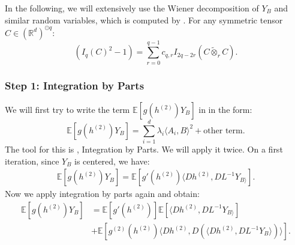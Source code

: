 \documentclass[]{article}
\numberwithin{equation}{section}
\theoremstyle{definition}
\newcommand{\RR}{\mathbb{R}}
\newcommand{\EE}{\mathbb{E}}
\begin{document}
In the following, we will extensively use the Wiener decomposition of $Y_{B}$ and similar random variables, which is computed by . For any symmetric tensor $C \in (\RR^{d})^{\odot q}$: 
\begin{equation}
    (I_{q}(C)^{2} -1)  = \sum_{r=0}^{q-1}c_{q,r} I_{2q-2r}(C\tilde{\otimes}_{r} C). 
    \label{eq:wiener_decomp_Y_B}
\end{equation}

\subsubsection{Step 1: Integration by Parts}

We will first try to write the term $\EE\left[ g(h^{(2)}) Y_{B}\right ]$ in  in the form:
\begin{equation}
    \EE\left[ g(h^{(2)}) Y_{B}\right ] = \sum_{i=1}^{d} \lambda_i \langle A_i, B \rangle^{2} + \text{other term}. 
\end{equation} 
The tool for this is , Integration by Parts. We will apply it twice. On a first iteration, since $Y_{B}$ is centered, we have: 
\begin{align}
    \EE\left[ g(h^{(2)}) Y_{B}\right ] =  \EE \left [ g'(h^{(2)}) \langle Dh^{(2)}, DL^{-1}Y_{B \rangle}\right ].
\end{align}
Now we apply integration by parts again and obtain:
\begin{align}
   \EE\left[ g(h^{(2)}) Y_{B}\right ]  &= \EE \left [ g'(h^{(2)}) \right ]\EE \left [ \langle Dh^{(2)}, DL^{-1}Y_{B \rangle}\right ] \\
    & +  \EE \left [ g^{(2)}(h^{(2)}) \langle Dh^{(2)}, D \left ( \langle Dh^{(2)}, DL^{-1}Y_{B}\rangle \right ) \rangle\right ].
    \label{eq:int_by_parts_twice}
\end{align}
\end{document}
